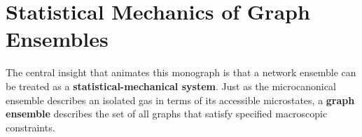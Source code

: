 \chapter{Statistical Mechanics of Graph Ensembles}

The central insight that animates this monograph is that a network ensemble can be treated as a \textbf{statistical-mechanical system}. Just as the microcanonical ensemble describes an isolated gas in terms of its accessible microstates, a \textbf{graph ensemble} describes the set of all graphs that satisfy specified macroscopic constraints.
